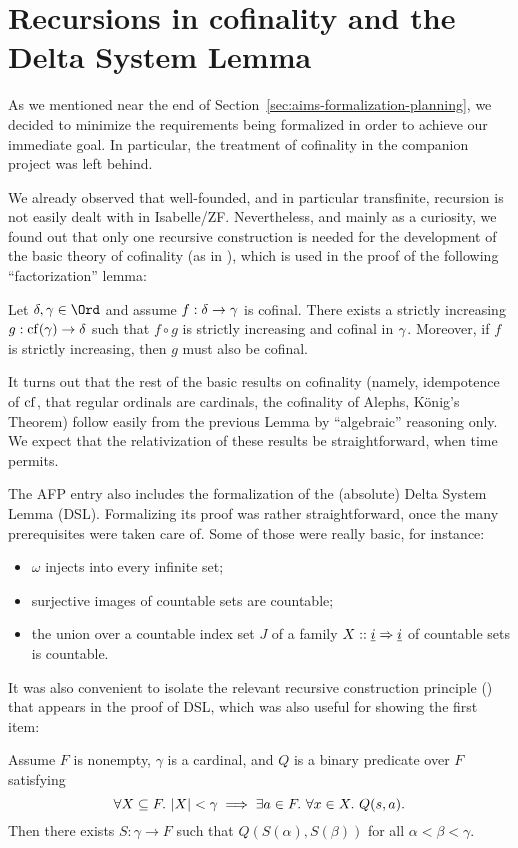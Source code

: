 \section{Recursions in cofinality and the Delta System Lemma}\label{sec:recursions-cofinality}

As we mentioned near the end of
Section~\ref{sec:aims-formalization-planning}, we decided to minimize
the requirements being formalized in order to achieve our immediate
goal. In particular, the treatment of cofinality in the companion
project \cite{Delta_System_Lemma-AFP} was left behind.

We already observed that well-founded, and in particular transfinite,
recursion is not easily dealt with in Isabelle/ZF. Nevertheless, and
mainly as a curiosity, we found out that only one recursive
construction is needed for the development of the basic theory of
cofinality (as in \cite[Sect.~I.13]{kunen2011set}), which is used in
the proof of the following “factorization” lemma:

\begin{lemma}
  Let $\del,\ga\in\Ord$ and assume $f:\delta\to\gamma$ is cofinal.  There exists
  a strictly increasing $g:\operatorname{cf}(\gamma)\to \delta$ such that $f\circ g$ is
  strictly increasing and cofinal in $\gamma$. Moreover, if $f$ is
  strictly increasing, then $g$ must also be cofinal.
\end{lemma}

It turns out that the rest of the basic results on cofinality (namely,
idempotence of $\operatorname{cf}$, that regular ordinals are cardinals, the
cofinality of Alephs, König's Theorem) follow easily from the previous
Lemma by “algebraic” reasoning only.
We expect that the relativization of these
results be straightforward, when time permits.

The AFP entry \cite{Delta_System_Lemma-AFP} also includes the
formalization of the (absolute) Delta System Lemma (DSL). Formalizing its
proof was rather straightforward, once the many prerequisites were
taken care of. Some of those were really basic, for instance:
\begin{itemize}
\item $\omega$ injects into every infinite set;
\item surjective images of countable sets are countable;
\item the union over a countable index set $J$ of a family $X :: \tyi
  \fun \tyi$ of countable sets is countable.
\end{itemize}
It was also convenient to isolate the relevant recursive construction
principle () that
appears in the proof of DSL, which was also useful for showing the
first item:
\begin{lemma}
  Assume $F$ is nonempty,
  $\gamma$ is a cardinal, and $Q$ is a binary predicate over $F$ satisfying 
  \[
    \forall X \subseteq F.\ |X| < \gamma \implies \exists a\in F.\ \forall
    x\in X.\ Q(s,a).
  \]
  Then there exists  $S:\gamma \to F$ such that
  $Q(S(\alpha),S(\beta))$ for all $\alpha<\beta<\gamma$.
\end{lemma}

